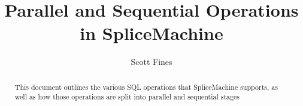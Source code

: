 \documentclass[10pt]{amsart}
\begin{document}
\title{Parallel and Sequential Operations in SpliceMachine}
\author{Scott Fines}

\begin{abstract}
This document outlines the various SQL operations that SpliceMachine supports, as well as how those operations are split into parallel and sequential stages
\end{abstract}

\maketitle


\end{document}
